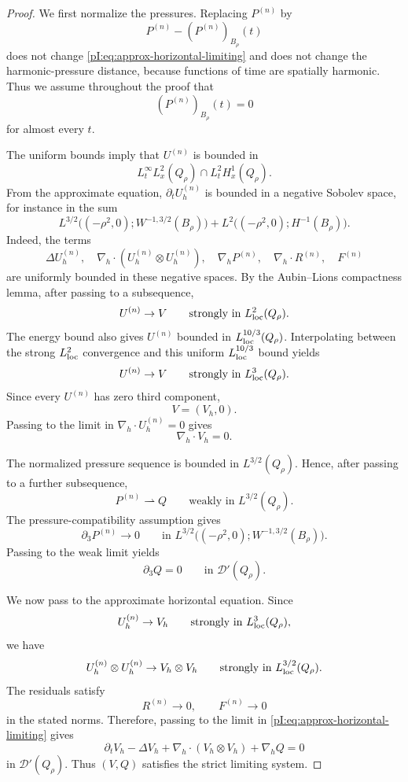 \documentclass[11pt]{article}
\numberwithin{equation}{section}
\theoremstyle{plain}
\theoremstyle{definition}
\theoremstyle{remark}
\newcommand{\nabh}{\nabla_h}
\newcommand{\divh}{\nabla_h\!\cdot}
\begin{document}
\begin{proof}
We first normalize the pressures.  Replacing \(P^{(n)}\) by
\[
        P^{(n)}-(P^{(n)})_{B_\rho}(t)
\]
does not change \eqref{pI:eq:approx-horizontal-limiting} and does not change the harmonic-pressure distance, because functions of time are spatially harmonic.  Thus we assume throughout the proof that
\[
        (P^{(n)})_{B_\rho}(t)=0
\]
for almost every \(t\).

The uniform bounds imply that \(U^{(n)}\) is bounded in
\[
        L^\infty_tL^2_x(Q_\rho)\cap L^2_tH^1_x(Q_\rho).
\]
From the approximate equation, \(\partial_tU_h^{(n)}\) is bounded in a negative Sobolev space, for instance in the sum
\[
        L^{3/2}\bigl((-\rho^2,0);W^{-1,3/2}(B_\rho)\bigr)
        +
        L^2\bigl((-\rho^2,0);H^{-1}(B_\rho)\bigr).
\]
Indeed, the terms
\[
        \Delta U_h^{(n)},\quad
        \divh(U_h^{(n)}\otimes U_h^{(n)}),\quad
        \nabh P^{(n)},\quad
        \divh R^{(n)},\quad
        F^{(n)}
\]
are uniformly bounded in these negative spaces.  By the Aubin--Lions compactness lemma, after passing to a subsequence,
\[
        U^{(n)}\to V
        \qquad\text{strongly in }L^2_{\rm loc}(Q_\rho).
\]
The energy bound also gives \(U^{(n)}\) bounded in \(L^{10/3}_{\rm loc}(Q_\rho)\).  Interpolating between the strong \(L^2_{\rm loc}\) convergence and this uniform \(L^{10/3}_{\rm loc}\) bound yields
\[
        U^{(n)}\to V
        \qquad\text{strongly in }L^3_{\rm loc}(Q_\rho).
\]
Since every \(U^{(n)}\) has zero third component,
\[
        V=(V_h,0).
\]
Passing to the limit in \(\divh U_h^{(n)}=0\) gives
\[
        \divh V_h=0 .
\]

The normalized pressure sequence is bounded in \(L^{3/2}(Q_\rho)\).  Hence, after passing to a further subsequence,
\[
        P^{(n)}\rightharpoonup Q
        \qquad\text{weakly in }L^{3/2}(Q_\rho).
\]
The pressure-compatibility assumption gives
\[
        \partial_3P^{(n)}\to0
        \qquad\text{in }
        L^{3/2}\bigl((-\rho^2,0);W^{-1,3/2}(B_\rho)\bigr).
\]
Passing to the weak limit yields
\[
        \partial_3Q=0
        \qquad\text{in }\mathcal D'(Q_\rho).
\]

We now pass to the approximate horizontal equation.  Since
\[
        U_h^{(n)}\to V_h
        \qquad\text{strongly in }L^3_{\rm loc}(Q_\rho),
\]
we have
\[
        U_h^{(n)}\otimes U_h^{(n)}
        \to
        V_h\otimes V_h
        \qquad\text{strongly in }L^{3/2}_{\rm loc}(Q_\rho).
\]
The residuals satisfy
\[
        R^{(n)}\to0,
        \qquad
        F^{(n)}\to0
\]
in the stated norms.  Therefore, passing to the limit in \eqref{pI:eq:approx-horizontal-limiting} gives
\[
        \partial_tV_h-\Delta V_h
        +\divh(V_h\otimes V_h)
        +\nabh Q=0
\]
in \(\mathcal D'(Q_\rho)\).  Thus \((V,Q)\) satisfies the strict limiting system.


\end{proof}
\end{document}
